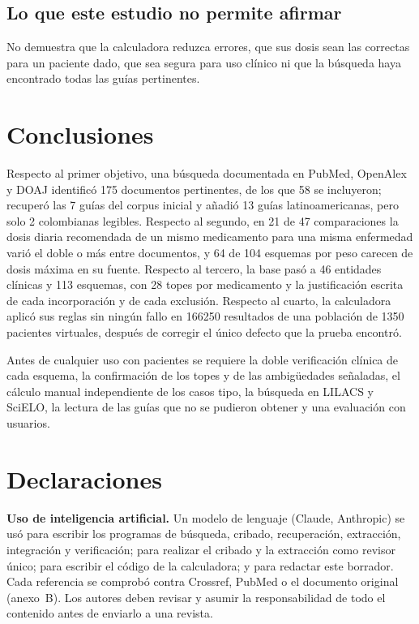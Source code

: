 \documentclass[11pt,a4paper]{article}
\begin{document}
\subsection{Lo que este estudio no permite afirmar}

No demuestra que la calculadora reduzca errores, que sus dosis sean las correctas para un paciente dado, que sea segura para uso clínico ni que la búsqueda haya encontrado todas las guías pertinentes.

\section{Conclusiones}

Respecto al primer objetivo, una búsqueda documentada en PubMed, OpenAlex y DOAJ identificó 175 documentos pertinentes, de los que 58 se incluyeron; recuperó las 7 guías del corpus inicial y añadió 13 guías latinoamericanas, pero solo 2 colombianas legibles. Respecto al segundo, en 21 de 47 comparaciones la dosis diaria recomendada de un mismo medicamento para una misma enfermedad varió el doble o más entre documentos, y 64 de 104 esquemas por peso carecen de dosis máxima en su fuente. Respecto al tercero, la base pasó a 46 entidades clínicas y 113 esquemas, con 28 topes por medicamento y la justificación escrita de cada incorporación y de cada exclusión. Respecto al cuarto, la calculadora aplicó sus reglas sin ningún fallo en \num{166250} resultados de una población de \num{1350} pacientes virtuales, después de corregir el único defecto que la prueba encontró.

Antes de cualquier uso con pacientes se requiere la doble verificación clínica de cada esquema, la confirmación de los topes y de las ambigüedades señaladas, el cálculo manual independiente de los casos tipo, la búsqueda en LILACS y SciELO, la lectura de las guías que no se pudieron obtener y una evaluación con usuarios.

\section*{Declaraciones}

\noindent\textbf{Uso de inteligencia artificial.} Un modelo de lenguaje (Claude, Anthropic) se usó para escribir los programas de búsqueda, cribado, recuperación, extracción, integración y verificación; para realizar el cribado y la extracción como revisor único; para escribir el código de la calculadora; y para redactar este borrador. Cada referencia se comprobó contra Crossref, PubMed o el documento original (anexo~B). Los autores deben revisar y asumir la responsabilidad de todo el contenido antes de enviarlo a una revista.
\end{document}
